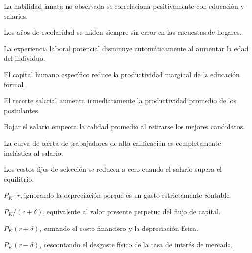 \begin{opts}
    \item La habilidad innata no observada se correlaciona positivamente con educación y salarios.
    \item Los años de escolaridad se miden siempre sin error en las encuestas de hogares.
    \item La experiencia laboral potencial disminuye automáticamente al aumentar la edad del individuo.
    \item El capital humano específico reduce la productividad marginal de la educación formal.
\end{opts}

\begin{opts}
    \item El recorte salarial aumenta inmediatamente la productividad promedio de los postulantes.
    \item Bajar el salario empeora la calidad promedio al retirarse los mejores candidatos.
    \item La curva de oferta de trabajadores de alta calificación es completamente inelástica al salario.
    \item Los costos fijos de selección se reducen a cero cuando el salario supera el equilibrio.
\end{opts}

\begin{opts}
    \item $P_K \cdot r$, ignorando la depreciación porque es un gasto estrictamente contable.
    \item $P_K / (r + \delta)$, equivalente al valor presente perpetuo del flujo de capital.
    \item $P_K (r + \delta)$, sumando el costo financiero y la depreciación física.
    \item $P_K (r - \delta)$, descontando el desgaste físico de la tasa de interés de mercado.
\end{opts}

